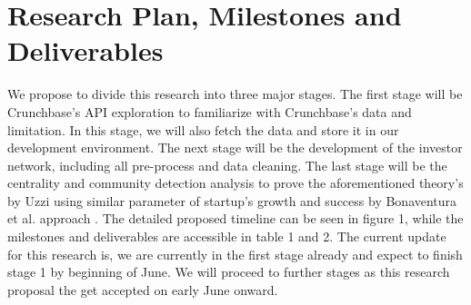 \documentclass[a4paper,11pt]{article}
\begin{document}
\section{Research Plan, Milestones and Deliverables}

We propose to divide this research into three major stages. The first stage will be Crunchbase's API exploration to familiarize with Crunchbase's data and limitation. In this stage, we will also fetch the data and store it in our development environment. The next stage will be the development of the investor network, including all pre-process and data cleaning. The last stage will be the centrality and community detection analysis to prove the aforementioned theory's by Uzzi \cite{uzzi2021a} using similar parameter of startup's growth and success by Bonaventura et al. approach \cite{bonaventura2020a}. The detailed proposed timeline can be seen in figure 1, while the milestones and deliverables are accessible in table 1 and 2. The current update for this research is, we are currently in the first stage already and expect to finish stage 1 by beginning of June. We will proceed to further stages as this research proposal the get accepted on early June onward.

\end{document}
